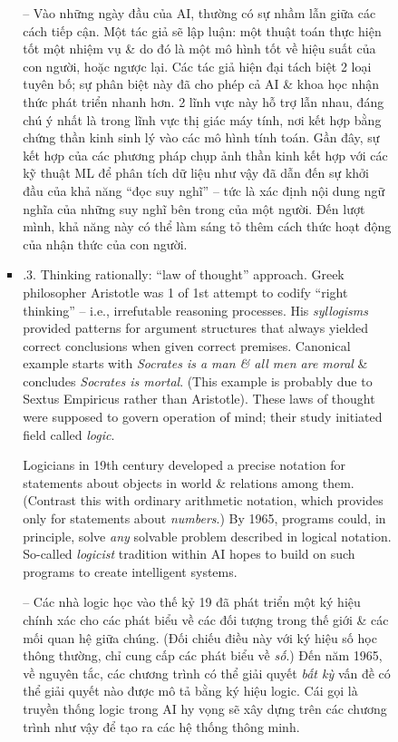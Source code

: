 \documentclass{article}
\begin{document}
\begin{itemize}
\begin{itemize}
\begin{itemize}
\begin{itemize}
				-- Vào những ngày đầu của AI, thường có sự nhầm lẫn giữa các cách tiếp cận. Một tác giả sẽ lập luận: một thuật toán thực hiện tốt một nhiệm vụ \& do đó là một mô hình tốt về hiệu suất của con người, hoặc ngược lại. Các tác giả hiện đại tách biệt 2 loại tuyên bố; sự phân biệt này đã cho phép cả AI \& khoa học nhận thức phát triển nhanh hơn. 2 lĩnh vực này hỗ trợ lẫn nhau, đáng chú ý nhất là trong lĩnh vực thị giác máy tính, nơi kết hợp bằng chứng thần kinh sinh lý vào các mô hình tính toán. Gần đây, sự kết hợp của các phương pháp chụp ảnh thần kinh kết hợp với các kỹ thuật ML để phân tích dữ liệu như vậy đã dẫn đến sự khởi đầu của khả năng ``đọc suy nghĩ'' -- tức là xác định nội dung ngữ nghĩa của những suy nghĩ bên trong của một người. Đến lượt mình, khả năng này có thể làm sáng tỏ thêm cách thức hoạt động của nhận thức của con người.
				\item {.3. Thinking rationally: ``law of thought'' approach.} Greek philosopher {\sc Aristotle} was 1 of 1st attempt to codify ``right thinking'' -- i.e., irrefutable reasoning processes. His {\it syllogisms} provided patterns for argument structures that always yielded correct conclusions when given correct premises. Canonical example starts with {\it Socrates is a man \& all men are moral} \& concludes {\it Socrates is mortal}. (This example is probably due to {\sc Sextus Empiricus} rather than {\sc Aristotle}). These laws of thought were supposed to govern operation of mind; their study initiated field called {\it logic}.
				
				Logicians in 19th century developed a precise notation for statements about objects in world \& relations among them. (Contrast this with ordinary arithmetic notation, which provides only for statements about {\it numbers}.) By 1965, programs could, in principle, solve {\it any} solvable problem described in logical notation. So-called {\it logicist} tradition within AI hopes to build on such programs to create intelligent systems.
				
				-- Các nhà logic học vào thế kỷ 19 đã phát triển một ký hiệu chính xác cho các phát biểu về các đối tượng trong thế giới \& các mối quan hệ giữa chúng. (Đối chiếu điều này với ký hiệu số học thông thường, chỉ cung cấp các phát biểu về {\it số}.) Đến năm 1965, về nguyên tắc, các chương trình có thể giải quyết {\it bất kỳ} vấn đề có thể giải quyết nào được mô tả bằng ký hiệu logic. Cái gọi là truyền thống logic trong AI hy vọng sẽ xây dựng trên các chương trình như vậy để tạo ra các hệ thống thông minh.
				

\end{itemize}
\end{itemize}
\end{itemize}
\end{itemize}
\end{document}
